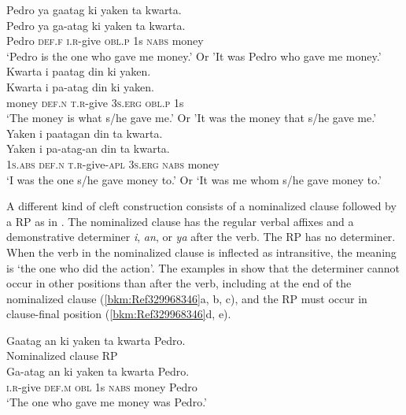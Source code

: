 \ea 
\label{bkm:Ref329967612}
Pedro  ya  gaatag  ki  yaken  ta  kwarta. \\\smallskip
\gll Pedro  ya  ga-atag  ki  yaken  ta  kwarta. \\
Pedro  \textsc{def.f}  \textsc{i.r}-give  \textsc{obl.p}  1s  \textsc{nabs}  money \\
\glt ‘Pedro is the one who gave me money.' Or 'It was Pedro who gave me money.’
\z
\ea
Kwarta  i  paatag  din  ki  yaken. \\\smallskip
\gll Kwarta  i  pa-atag  din  ki  yaken. \\
money  \textsc{def.n}  \textsc{t.r}-give  3\textsc{s.erg}  \textsc{obl.p}  1s \\
\glt ‘The money is what s/he gave me.' Or 'It was the money that s/he gave me.’
\z
\ea
\label{bkm:Ref113976722}
Yaken  i  paatagan  din   ta  kwarta. \\\smallskip
\gll Yaken  i  pa-atag-an  din   ta  kwarta. \\
1\textsc{s.abs}  \textsc{def.n}  \textsc{t.r}-give-\textsc{apl}  3\textsc{s.erg}  \textsc{nabs}  money \\
\glt ‘I was the one s/he gave money to.’ Or ‘It was me whom s/he gave money to.’
\z

A different kind of cleft construction consists of a nominalized clause followed by a RP as in . The nominalized clause has the regular verbal affixes and a demonstrative determiner \textit{i}, \textit{an}, or \textit{ya} after the verb. The RP has no determiner. When the verb in the nominalized clause is inflected as intransitive, the meaning is ‘the one who did the action’. The examples in  show that the determiner cannot occur in other positions than after the verb, including at the end of the nominalized clause (\ref{bkm:Ref329968346}a, b, c), and the RP must occur in clause-final position (\ref{bkm:Ref329968346}d, e).

\ea 
\label{bkm:Ref329967818}
Gaatag  an  ki  yaken  ta  kwarta  Pedro. \\\smallskip
Nominalized clause\hspace{2cm}              RP \\
\gll Ga-atag  an  ki  yaken  ta  kwarta  Pedro. \\
\textsc{i.r}-give  \textsc{def.m}  \textsc{obl}  1s  \textsc{nabs}  money  Pedro \\
\glt ‘The one who gave me money was Pedro.’
\z
\ea 
\label{bkm:Ref329968346}
    \z
\z

